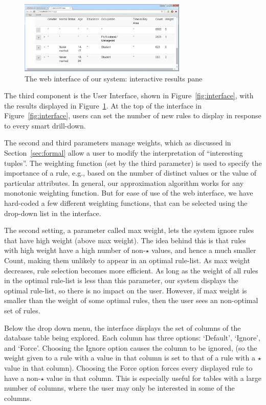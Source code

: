 \begin{figure}[ht]
\vspace{-5pt}
\centering
\includegraphics[width=80mm,frame]{graphs/uiresults.jpg}
\vspace{-5pt}
\caption{The web interface of our system: interactive results pane \label{fig:results}}
\vspace{-5pt}
\end{figure}

 The third component is the User Interface, 
shown in Figure~\ref{fig:interface}, with the results displayed in Figure~\ref{fig:results}.
At the top of the interface in Figure~\ref{fig:interface}, users can set the number 
of new rules to display in response to every smart drill-down. 

The second and third parameters manage weights, which as discussed in Section~\ref{sec:formal} allow a user to modify the interpretation of ``interesting tuples''.
The weighting function (set by the third parameter) is used to specify the importance of a rule, e.g., based on the number of distinct values or the value of particular attributes. In general, our approximation algorithm works for any monotonic weighting function. 
But for ease of use of the web interface, we have hard-coded a few different weighting functions, that can be selected using the drop-down list in the interface.

The second setting, a parameter called max weight, lets the system ignore rules that have high weight (above max weight). The idea behind this is that rules with high weight have a high number of non-$\star$ values, and hence a much smaller Count, making them unlikely to appear in an optimal rule-list. As max weight decreases, rule selection becomes more efficient. As long as the weight of all rules in the optimal rule-list is less than this
parameter, our system displays the optimal rule-list, so there is no impact on the user. However, if max weight is smaller than the weight of some optimal rules, then the user sees an non-optimal set of rules.

Below the drop down menu, the interface displays the set of columns of the database table being explored. Each column has three options: `Default', `Ignore', and `Force'. Choosing the Ignore option causes the column to be ignored, (so the weight given to a rule with a value in that column is set to that of a rule with a $\star$ value in that column). Choosing the Force option forces every displayed rule to have a non-$\star$ value in that column. This is especially useful for tables with a large number of columns, where the user may only be interested in some of the columns. 

